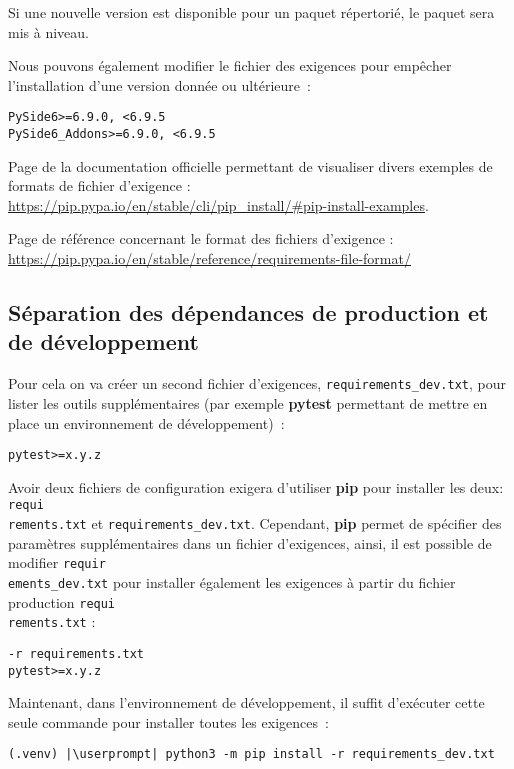 Si une nouvelle version est disponible pour un paquet répertorié, le paquet sera mis à niveau.

Nous pouvons également modifier le fichier des exigences pour empêcher l’installation d'une version donnée ou ultérieure :
\begin{lstlisting}[style=file]
PySide6>=6.9.0, <6.9.5
PySide6_Addons>=6.9.0, <6.9.5
\end{lstlisting}

Page de la documentation officielle permettant de visualiser divers exemples de formats de fichier d'exigence : \url{https://pip.pypa.io/en/stable/cli/pip_install/#pip-install-examples}.

Page de référence concernant le format des fichiers d'exigence : \url{https://pip.pypa.io/en/stable/reference/requirements-file-format/}

\subsection*{Séparation des dépendances de production et de développement}
Pour cela on va créer un second fichier d'exigences, \texttt{requirements\_dev.txt}, pour lister les outils supplémentaires (par exemple \textbf{pytest} permettant de mettre en place un environnement de développement) :
\begin{lstlisting}[style=file]
pytest>=x.y.z
\end{lstlisting}

Avoir deux fichiers de configuration exigera d'utiliser \textbf{pip} pour installer les deux: \texttt{requi\\rements.txt} et \texttt{requirements\_dev.txt}. Cependant, \textbf{pip} permet de spécifier des paramètres supplémentaires dans un fichier d'exigences, ainsi, il est possible de modifier \texttt{requir\\ements\_dev.txt} pour installer également les exigences à partir du fichier production \texttt{requi\\rements.txt} :
\begin{lstlisting}[style=file]
-r requirements.txt
pytest>=x.y.z
\end{lstlisting}

Maintenant, dans l'environnement de développement, il suffit d’exécuter cette seule commande pour installer toutes les exigences :
\begin{lstlisting}[style=bash]
(.venv) |\userprompt| python3 -m pip install -r requirements_dev.txt
\end{lstlisting}

